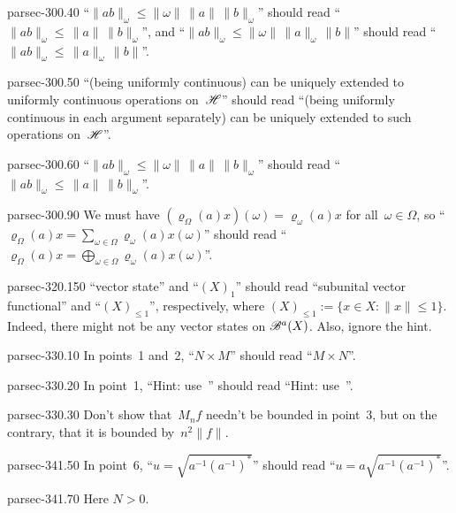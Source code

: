 \documentclass[b5page]{book}
\begin{document}
\begin{erratum}{parsec-300.40}
``$\|ab\|_\omega \leq \|\omega\|\,\|a\|\,\|b\|_\omega$''
should read
``$\|ab\|_\omega \leq\,\|a\|\,\|b\|_\omega$'',
and
``$\|ab\|_\omega \leq \|\omega\|\,\|a\|_\omega\,\|b\|$''
should read
``$\|ab\|_\omega \leq\,\|a\|_\omega\,\|b\|$''.
\end{erratum}
\begin{erratum}{parsec-300.50}%
``(being uniformly continuous) can be uniquely extended
to uniformly continuous operations on~$\mathscr{H}$''
should read
``(being uniformly continuous in each argument separately)
can be uniquely extended to such operations on~$\mathscr{H}$''.
\end{erratum}
\begin{erratum}{parsec-300.60}
``$\|ab\|_\omega \leq \|\omega\|\,\|a\|\,\|b\|_\omega$''
should read
``$\|ab\|_\omega \leq\,\|a\|\,\|b\|_\omega$''.
\end{erratum}
\begin{erratum}{parsec-300.90}
We must have $(\varrho_\Omega(a)x)(\omega)
= \varrho_\omega(a)x$
for all~$\omega\in\Omega$,
so
``$\varrho_\Omega(a)x = \sum_{\omega\in\Omega}
\varrho_\omega(a)x(\omega)$''
should read
``$\varrho_\Omega(a)x = \bigoplus_{\omega\in\Omega}
\varrho_\omega(a)x(\omega)$''.
\end{erratum}
\begin{erratum}{parsec-320.150}
``vector state'' and ``$(X)_1$''
should read ``subunital vector functional''
and ``$(X)_{\leq 1}$'', respectively,
where $(X)_{\leq 1} := 
\{x\in X\colon \|x\|\leq 1\}$.
Indeed, there might
not be any vector states on $\mathscr{B}^a(X)$.
Also, ignore the hint.
\end{erratum}
\begin{erratum}{parsec-330.10}
In points~1 and~2,
``$N\times M$'' should read
``$M\times N$''.
\end{erratum}
\begin{erratum}{parsec-330.20}
In point~1,
``Hint: use~'' should read
``Hint: use~''.
\end{erratum}
\begin{erratum}{parsec-330.30}
Don't show that~$M_nf$ needn't be bounded
in point~3,
but on the contrary, that it is bounded by~$n^2\|f\|$.
\end{erratum}
\begin{erratum}{parsec-341.50}
In point~6, ``$u=\sqrt{a^{-1}(a^{-1})^*}$''
should read ``$u=a\sqrt{a^{-1}(a^{-1})^*}$''.
\end{erratum}
\begin{erratum}{parsec-341.70}
Here $N>0$.
\end{erratum}
\end{document}
